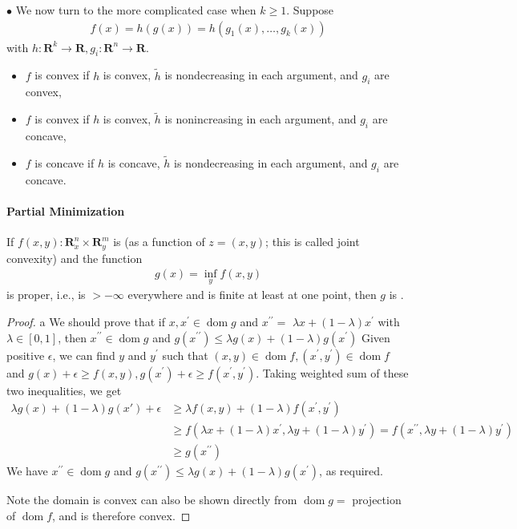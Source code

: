 \documentclass{article}
\newcommand{\dom}{\operatorname{dom}}
\begin{document}
$\bullet$ 
We now turn to the more complicated case when $k \geq 1$. Suppose
\begin{align*}
f(x)=h(g(x))=h\left(g_{1}(x), \ldots, g_{k}(x)\right)
\end{align*}
with $h: \mathbf{R}^{k} \rightarrow \mathbf{R}, g_{i}: \mathbf{R}^{n} \rightarrow \mathbf{R}$. 
\begin{itemize}
    \item $f$ is convex if $h$ is convex, $\tilde{h}$ is nondecreasing in each argument, and $g_{i}$ are convex,
    \item $f$ is convex if $h$ is convex, $\tilde{h}$  is nonincreasing in each argument, and $g_{i}$ are concave,
    \item $f$ is concave if $h$ is concave, $\tilde{h}$  is nondecreasing in each argument, and $g_{i}$ are concave.
\end{itemize}

\paragraph{Partial Minimization}
If $f(x, y): \mathbf{R}_{x}^{n} \times \mathbf{R}_{y}^{m}$ is  (as a function of $z=(x, y)$; this is called joint convexity) and the function
\begin{align*}
g(x)=\inf _{y} f(x, y)
\end{align*}
is proper, i.e., is $>-\infty$ everywhere and is finite at least at one point, then $g$ is .

\begin{proof}\color{ForestGreen}a
We should prove that if $x, x^{\prime} \in \dom g$ and $x^{\prime \prime}=$ $\lambda x+(1-\lambda) x^{\prime}$ with $\lambda \in[0,1]$, then $x^{\prime \prime} \in \dom  g$ and
 $g\left(x^{\prime \prime}\right) \leq \lambda g(x)+(1-\lambda) g\left(x^{\prime}\right)$ Given positive $\epsilon$, we can find $y$ and $y^{\prime}$ such that $(x, y) \in \dom  f,\left(x^{\prime}, y^{\prime}\right) \in\dom f$ and $g(x)+\epsilon \geq f(x, y), g\left(x^{\prime}\right)+\epsilon \geq f\left(x^{\prime}, y^{\prime}\right)$. Taking weighted sum of these two inequalities, we get
\begin{align*}
\lambda g(x)+(1-\lambda) g(x')+\epsilon &\geq \lambda f(x, y)+(1-\lambda) f\left(x^{\prime}, y^{\prime}\right) \\
&\geq f\left(\lambda x+(1-\lambda) x^{\prime}, \lambda y+(1-\lambda) y^{\prime}\right)=f\left(x^{\prime \prime}, \lambda y+(1-\lambda) y^{\prime}\right)\\
&\geq g\left(x^{\prime \prime}\right)
\end{align*}
We have $x^{\prime \prime} \in \dom  g$ and $g\left(x^{\prime \prime}\right) \leq \lambda g(x)+(1-\lambda) g\left(x^{\prime}\right)$, as required.
 
Note the domain is convex  can also be shown directly from $\dom g =$ projection of $\dom f$, and is therefore convex. 
\end{proof}
\end{document}
